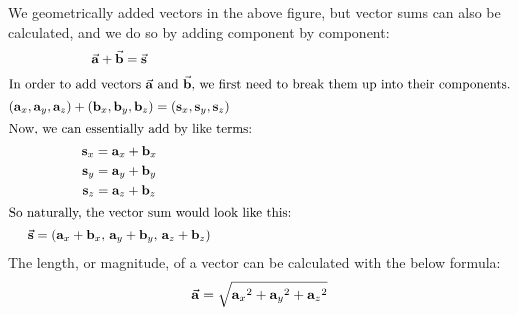 \documentclass{article}
\newcommand{\subx}[1]{\mathrm{\bf #1}_x}
\newcommand{\suby}[1]{\mathrm{\bf #1}_y}
\newcommand{\subz}[1]{\mathrm{\bf #1}_z}
\newcommand{\vect}[1]{(\subx{#1}, \suby{#1}, \subz{#1})}
\begin{document}
We geometrically added vectors in the above figure, but vector sums can also be calculated,
and we do so by adding component by component:
\begin{gather*}
    \va{a}+\va{b}=\va{s} \\ 
    \intertext{\centering In order to add vectors $\va{a}$ and $\va{b}$, we first need to break them up into their components.}
    \vect{a}+\vect{b}=\vect{s} \\
    \intertext{\centering Now, we can essentially add by like terms:}
    \subx{s} = \subx{a} + \subx{b} \\
    \suby{s} = \suby{a} + \suby{b} \\
    \subz{s} = \subz{a} + \subz{b} \\
    \intertext{\centering So naturally, the vector sum would look like this:}
    \va{s} = (\subx{a} + \subx{b},\, \suby{a} + \suby{b},\, \subz{a} + \subz{b})
\end{gather*} 
\newpage
The length, or magnitude, of a vector can be calculated with the below formula:
\[\va{a} = \sqrt{{\subx{a}}^2+{\suby{a}}^2+{\subz{a}}^2}\]
\end{document}
